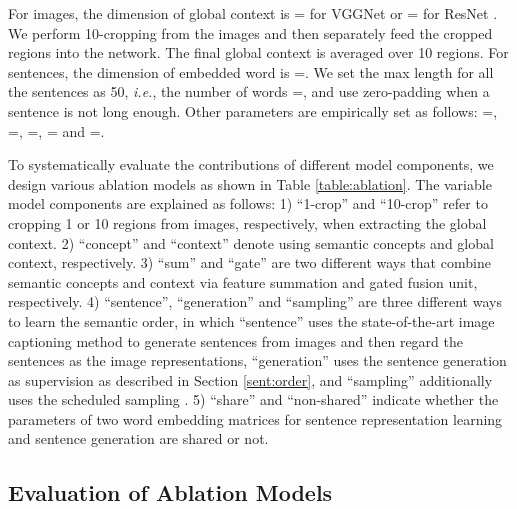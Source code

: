 \documentclass[10pt,twocolumn,letterpaper]{article}
\begin{document}
For images, the dimension of global context
is = for VGGNet \cite{simonyan2014very}
or = for ResNet \cite{he2016deep}.
We perform 10-cropping \cite{klein2015associating} from the images
and then separately feed the cropped regions into the network.
The final global context is averaged over 10 regions.
For sentences, the dimension of embedded word is =.
We set the max length for all the sentences as 50,
\emph{i.e.}, the number of words =,
and use zero-padding when a sentence is not long enough.
Other parameters are empirically set as follows:
=, =, =, = and =.


To systematically evaluate the contributions of different
model components, we design various ablation models
as shown in Table \ref{table:ablation}.
The variable model components are explained as follows:
1) ``1-crop'' and ``10-crop'' refer to cropping 1 or 10 regions from
images, respectively, when extracting the global context.
2) ``concept'' and ``context'' denote using semantic concepts and global context, respectively.
3) ``sum'' and ``gate'' are two different ways that combine semantic concepts
and context via feature summation and gated fusion unit, respectively.
4) ``sentence'', ``generation'' and ``sampling'' are three different ways to learn
the semantic order, in which ``sentence'' uses the state-of-the-art
image captioning method \cite{vinyals2017show} to generate sentences from
images and then regard the sentences as the image representations,
``generation'' uses the sentence generation as supervision
as described in Section \ref{sent:order}, and ``sampling'' additionally uses
the scheduled sampling \cite{bengio2015scheduled}.
5) ``share'' and ``non-shared'' indicate whether the parameters of
two word embedding matrices for sentence representation learning
and sentence generation are shared or not.





\subsection{Evaluation of Ablation Models} \label{sent:ablation}
\end{document}
